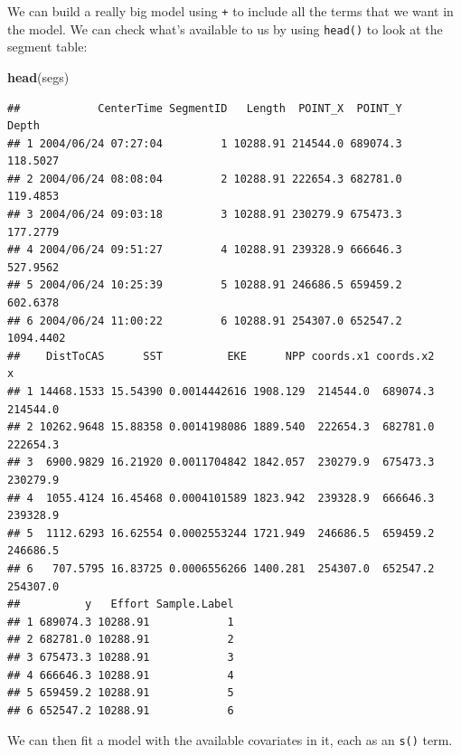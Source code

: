\documentclass[]{book}
\newenvironment{Shaded}{\begin{snugshade}}{\end{snugshade}}
\newcommand{\KeywordTok}[1]{\textcolor[rgb]{0.13,0.29,0.53}{\textbf{#1}}}
\newcommand{\NormalTok}[1]{#1}
\theoremstyle{definition}
\theoremstyle{definition}
\theoremstyle{remark}
\begin{document}
We can build a really big model using \texttt{+} to include all the
terms that we want in the model. We can check what's available to us by
using \texttt{head()} to look at the segment table:

\begin{Shaded}
\begin{Highlighting}[]
\KeywordTok{head}\NormalTok{(segs)}
\end{Highlighting}
\end{Shaded}

\begin{verbatim}
##            CenterTime SegmentID   Length  POINT_X  POINT_Y     Depth
## 1 2004/06/24 07:27:04         1 10288.91 214544.0 689074.3  118.5027
## 2 2004/06/24 08:08:04         2 10288.91 222654.3 682781.0  119.4853
## 3 2004/06/24 09:03:18         3 10288.91 230279.9 675473.3  177.2779
## 4 2004/06/24 09:51:27         4 10288.91 239328.9 666646.3  527.9562
## 5 2004/06/24 10:25:39         5 10288.91 246686.5 659459.2  602.6378
## 6 2004/06/24 11:00:22         6 10288.91 254307.0 652547.2 1094.4402
##    DistToCAS      SST          EKE      NPP coords.x1 coords.x2        x
## 1 14468.1533 15.54390 0.0014442616 1908.129  214544.0  689074.3 214544.0
## 2 10262.9648 15.88358 0.0014198086 1889.540  222654.3  682781.0 222654.3
## 3  6900.9829 16.21920 0.0011704842 1842.057  230279.9  675473.3 230279.9
## 4  1055.4124 16.45468 0.0004101589 1823.942  239328.9  666646.3 239328.9
## 5  1112.6293 16.62554 0.0002553244 1721.949  246686.5  659459.2 246686.5
## 6   707.5795 16.83725 0.0006556266 1400.281  254307.0  652547.2 254307.0
##          y   Effort Sample.Label
## 1 689074.3 10288.91            1
## 2 682781.0 10288.91            2
## 3 675473.3 10288.91            3
## 4 666646.3 10288.91            4
## 5 659459.2 10288.91            5
## 6 652547.2 10288.91            6
\end{verbatim}

We can then fit a model with the available covariates in it, each as an
\texttt{s()} term.
\end{document}

